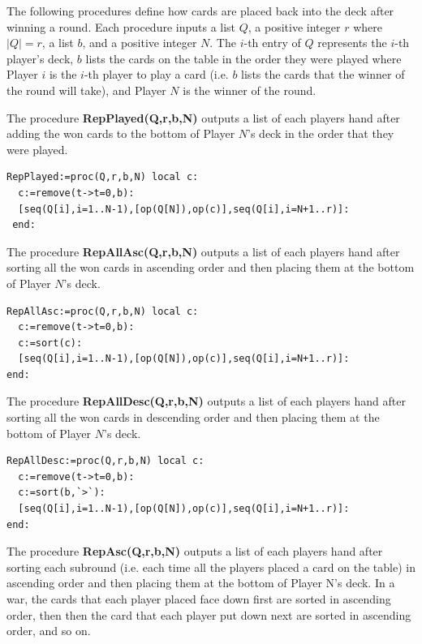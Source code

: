 \documentclass[12pt]{amsart}
\begin{document}
The following procedures define how cards are placed back into the deck after winning a round. Each procedure inputs a list $Q$, a positive integer $r$ where $|Q|=r$, a list $b$, and a positive integer $N$. The $i$-th entry of $Q$ represents the $i$-th player's deck, $b$ lists the cards on the table in the order they were played where Player $i$ is the $i$-th player to play a card (i.e. $b$ lists the cards that the winner of the round will take), and Player $N$ is the winner of the round.


The procedure \textbf{RepPlayed(Q,r,b,N)} outputs a list of each players hand after adding the won cards to the bottom of Player $N$'s deck in the order that they were played.


\begin{lstlisting}
RepPlayed:=proc(Q,r,b,N) local c:
  c:=remove(t->t=0,b):
  [seq(Q[i],i=1..N-1),[op(Q[N]),op(c)],seq(Q[i],i=N+1..r)]:
 end:
\end{lstlisting}


The procedure \textbf{RepAllAsc(Q,r,b,N)} outputs a list of each players hand after sorting all the won cards in ascending order and then placing them at the bottom of Player $N$'s deck.


\begin{lstlisting}
RepAllAsc:=proc(Q,r,b,N) local c:
  c:=remove(t->t=0,b):
  c:=sort(c):
  [seq(Q[i],i=1..N-1),[op(Q[N]),op(c)],seq(Q[i],i=N+1..r)]:
end:
\end{lstlisting}


The procedure \textbf{RepAllDesc(Q,r,b,N)} outputs a list of each players hand after sorting all the won cards in descending order and then placing them at the bottom of Player $N$'s deck.




\begin{lstlisting}
RepAllDesc:=proc(Q,r,b,N) local c:
  c:=remove(t->t=0,b):
  c:=sort(b,`>`):
  [seq(Q[i],i=1..N-1),[op(Q[N]),op(c)],seq(Q[i],i=N+1..r)]:
end:
\end{lstlisting}




The procedure \textbf{RepAsc(Q,r,b,N)} outputs a list of each players hand after sorting each subround (i.e. each time all the players placed a card on the table) in ascending order and then placing them at the bottom of Player N's deck. In a war, the cards that each player placed face down first are sorted in ascending order, then then the card that each player put down next are sorted in ascending order, and so on.
\end{document}
